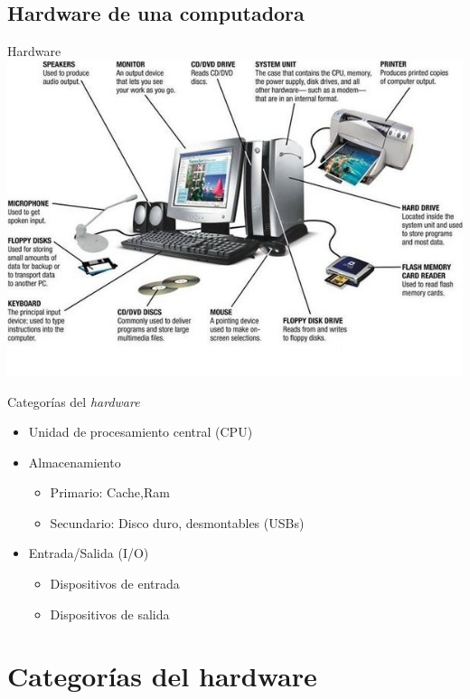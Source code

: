 \documentclass[11pt]{beamer}
\begin{document}
	\subsection{Hardware de una computadora}
		\begin{frame}{Hardware}
			\includegraphics[width=\textwidth]{hardware.jpg}
		\end{frame}
		\begin{frame}{Categorías del \textit{hardware}}
			\begin{itemize}
				\item Unidad de procesamiento central (CPU)
				\item Almacenamiento
				\begin{itemize}
					\item Primario: Cache,Ram
					\item Secundario: Disco duro, desmontables (USBs)
				\end{itemize}
				\item Entrada/Salida (I/O)
				\begin{itemize}
					\item Dispositivos de entrada
					\item Dispositivos de salida
				\end{itemize}
			\end{itemize}
		\end{frame}
\section{Categorías del hardware}
\end{document}
